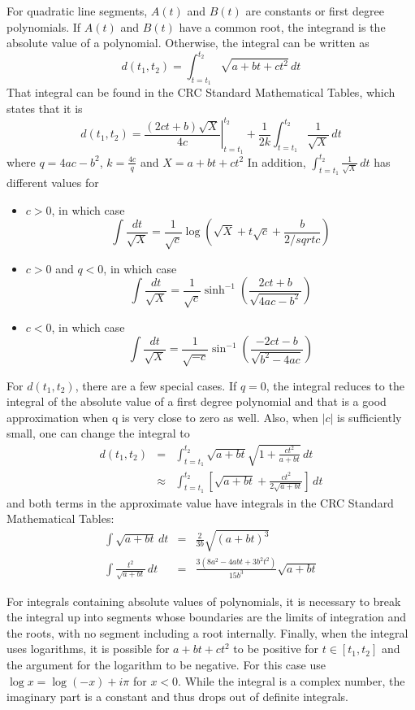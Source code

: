 \documentclass[12pt]{article}
\begin{document}
For quadratic line segments, $A(t)$ and $B(t)$ are constants or
first degree polynomials.  If $A(t)$ and $B(t)$ have a common
root, the integrand is the absolute value of a
polynomial. Otherwise, the integral can be written as
\[ d(t_1, t_2) = \int_{t=t_1}^{t_2} \sqrt{a + bt + ct^2}\,dt\]
That integral can be found in the CRC Standard Mathematical
Tables, which states that it is
\[ d(t_1,t_2) = \left. \frac{(2ct+b)\sqrt{X}}{4c}
\right|_{t=t_1}^{t_2} + \frac{1}{2k}\int_{t=t_1}^{t_2}\frac{1}{
\sqrt{X}}\,dt\]
where $q = 4ac-b^2$, $k = \frac{4c}{q}$ and $X = a + bt + ct^2$
In addition,
$\int_{t=t_1}^{t_2}\frac{1}{\sqrt{X}}\,dt$ has different values for
\begin{itemize}
  \item $c > 0$, in which case
	\[ \int \frac{dt}{\sqrt{X}} = \frac1{\sqrt{c}}
	\log (\sqrt{X} + t\sqrt{c} + \frac{b}{2/sqrt{c}}) \]
  \item $c > 0$ and $q < 0$, in which case
	\[ \int \frac{dt}{\sqrt{X}} = \frac1{\sqrt{c}}
	\sinh^{-1} \left(\frac{2ct+b}{\sqrt{4ac-b^2}}\right) \]
  \item $c < 0$, in which case
	\[\int \frac{dt}{\sqrt{X}} = \frac1{\sqrt{-c}}
	\sin^{-1} \left(\frac{-2ct-b}{\sqrt{b^2 - 4ac}}\right) \]
\end{itemize}
For $d(t_1,t_2)$, there are a few special cases.  If $q = 0$, the
integral reduces to the integral of the absolute value of a
first degree polynomial and that is a good approximation when q
is very close to zero as well.  Also, when $|c|$ is sufficiently
small, one can change the integral to
\begin{eqnarray*}d(t_1,t_2) & = & \int_{t=t_1}^{t_2} \sqrt{a+bt}
\sqrt{1 +\frac{ct^2}{a+bt}}\,dt \\
& \approx & \int_{t=t_1}^{t_2}\left[
 \sqrt{a+bt} + \frac{ct^2}{2\sqrt{a+bt}}
\right]\,dt
\end{eqnarray*}
and both terms in the approximate value have integrals in the CRC
Standard Mathematical Tables:
\begin{eqnarray}
  \int \sqrt{a + bt}\,dt & = & \frac{2}{3b}\sqrt{(a+bt)^3} \\
  \int \frac{t^2}{\sqrt{a+bt}}\,dt & = &
       \frac{3(8a^2 - 4abt + 3b^2t^2)}{15b^3}\sqrt{a+bt}
\end{eqnarray}

For integrals containing absolute values of polynomials, it is
necessary to break the integral up into segments whose boundaries
are the limits of integration and the roots, with no segment including
a root internally. Finally, when the integral uses logarithms, it is
possible for $a+bt+ct^2$ to be positive for $t\in[t_1,t_2]$ and the
argument for the logarithm to be negative.  For this case
use $\log x = \log (-x) + i\pi$ for $x < 0$. While the integral is
a complex number, the imaginary part is a constant and thus drops out
of definite integrals.
\end{document}
